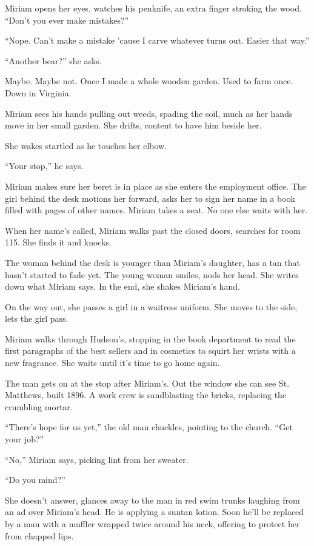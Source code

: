 \documentclass[
]{article}
\begin{document}
Miriam opens her eyes, watches his penknife, an extra finger stroking
the wood. ``Don't you ever make mistakes?''

``Nope. Can't make a mistake 'cause I carve whatever turns out. Easier
that way.''

``Another bear?'' she asks.

Maybe. Maybe not. Once I made a whole wooden garden. Used to farm once.
Down in Virginia.

Miriam sees his hands pulling out weeds, spading the soil, much as her
hands move in her small garden. She drifts, content to have him beside
her.

She wakes startled as he touches her elbow.

``Your stop,'' he says.

Miriam makes sure her beret is in place as she enters the employment
office. The girl behind the desk motions her forward, asks her to sign
her name in a book filled with pages of other names. Miriam takes a
seat. No one else waits with her.

When her name's called, Miriam walks past the closed doors, searches for
room 115. She finds it and knocks.

The woman behind the desk is younger than Miriam's daughter, has a tan
that hasn't started to fade yet. The young woman smiles, nods her head.
She writes down what Miriam says. In the end, she shakes Miriam's hand.

On the way out, she passes a girl in a waitress uniform. She moves to
the side, lets the girl pass.

Miriam walks through Hudson's, stopping in the book department to read
the first paragraphs of the best sellers and in cosmetics to squirt her
wrists with a new fragrance. She waits until it's time to go home again.

The man gets on at the stop after Miriam's. Out the window she can see
St. Matthews, built 1896. A work crew is sandblasting the bricks,
replacing the crumbling mortar.

``There's hope for us yet,'' the old man chuckles, pointing to the
church. ``Get your job?''

``No,'' Miriam says, picking lint from her sweater.

``Do you mind?''

She doesn't answer, glances away to the man in red swim trunks laughing
from an ad over Miriam's head. He is applying a suntan lotion. Soon
he'll be replaced by a man with a muffler wrapped twice around his neck,
offering to protect her from chapped lips.
\end{document}
